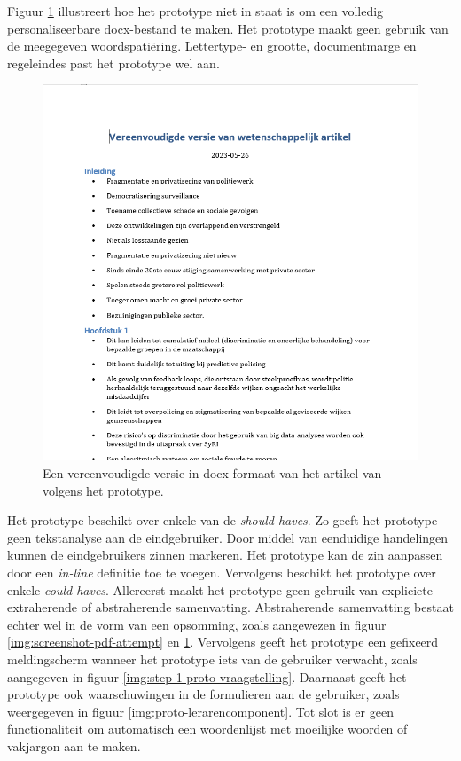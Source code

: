 Figuur \ref{img:screenshot-docx-attempt} illustreert hoe het prototype niet in staat is om een volledig personaliseerbare docx-bestand te maken. Het prototype maakt geen gebruik van de meegegeven woordspatiëring. Lettertype- en grootte, documentmarge en regeleindes past het prototype wel aan.

\begin{figure}[H]
	\includegraphics[width=\linewidth]{img/screenshot-prototype-word.png}
	\caption{Een vereenvoudigde versie in docx-formaat van het artikel van \textcite{VanBrakel2022} volgens het prototype.}
	\label{img:screenshot-docx-attempt}
\end{figure}

Het prototype beschikt over enkele van de \textit{should-haves}. Zo geeft het prototype geen tekstanalyse aan de eindgebruiker. Door middel van eenduidige handelingen kunnen de eindgebruikers zinnen markeren. Het prototype kan de zin aanpassen door een \textit{in-line} definitie toe te voegen. Vervolgens beschikt het prototype over enkele \textit{could-haves}. Allereerst maakt het prototype geen gebruik van expliciete extraherende of abstraherende samenvatting. Abstraherende samenvatting bestaat echter wel in de vorm van een opsomming, zoals aangewezen in figuur \ref{img:screenshot-pdf-attempt} en \ref{img:screenshot-docx-attempt}. Vervolgens geeft het prototype een gefixeerd meldingscherm wanneer het prototype iets van de gebruiker verwacht, zoals aangegeven in figuur \ref{img:step-1-proto-vraagstelling}. Daarnaast geeft het prototype ook waarschuwingen in de formulieren aan de gebruiker, zoals weergegeven in figuur \ref{img:proto-lerarencomponent}. Tot slot is er geen functionaliteit om automatisch een woordenlijst met moeilijke woorden of vakjargon aan te maken.

